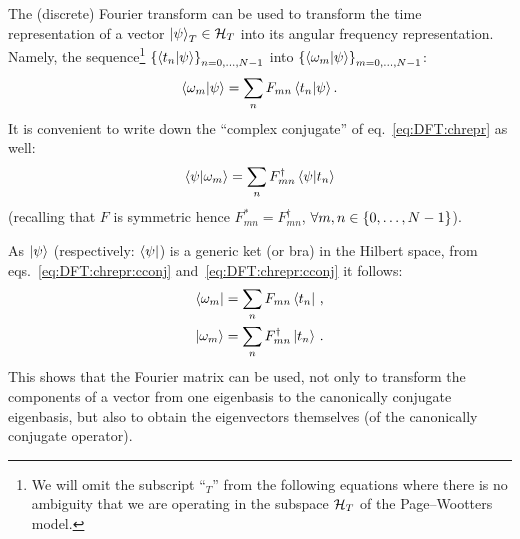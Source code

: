 
The (discrete) Fourier transform can be used to transform the time representation
of a vector $\ket{\psi}_T \in \mathcal{H}_T$ into its angular frequency representation.
Namely, the sequence\footnote{
  We will omit the subscript ``${}_{T}$'' from the following equations
  where there is no ambiguity that
  we are operating in the subspace $\mathcal{H}_T$
  of the Page--Wootters model.
}
$\left\{\braket{t_n}{\psi}\right\}_{n=0, \dots, N-1}$ into
$\left\{\braket{\omega_m}{\psi}\right\}_{m=0, \dots, N-1}$:
\begin{equation}\label{eq:DFT:chrepr}  %
  \braket{\omega_{m}}{\psi} = \sum_n F_{mn} \braket{t_n}{\psi} \text{.}
\end{equation}
It is convenient to write down the ``complex conjugate'' of eq.~\eqref{eq:DFT:chrepr} as well:
\begin{equation}\label{eq:DFT:chrepr:cconj}  %
  \braket{\psi}{\omega_{m}} = \sum_n F_{mn}^{\dagger} \braket{\psi}{t_n}
\end{equation}
(recalling that $F$ is symmetric hence
$F_{mn}^{*} = F_{mn}^{\dagger}$,
$\forall m,n \in \left\{0, \dots, N-1\right\}$).

As $\ket{\psi}$ (respectively: $\bra{\psi}$) is a generic ket (or bra) in the Hilbert space,
from eqs.~\eqref{eq:DFT:chrepr:cconj} and~\eqref{eq:DFT:chrepr:cconj} it follows:
\begin{align}
  \label{eq:DFT:bra}  \bra{\omega_{m}} &= \sum_n F_{mn}           \bra{t_n} \,\text{,}  \\
  \label{eq:DFT:ket}  \ket{\omega_{m}} &= \sum_n F_{mn}^{\dagger} \ket{t_n} \,\text{.}
\end{align}
This shows that the Fourier matrix can be used, not only to transform the components
of a vector from one eigenbasis to the canonically conjugate eigenbasis,
but also to obtain the eigenvectors themselves (of the canonically conjugate operator).

